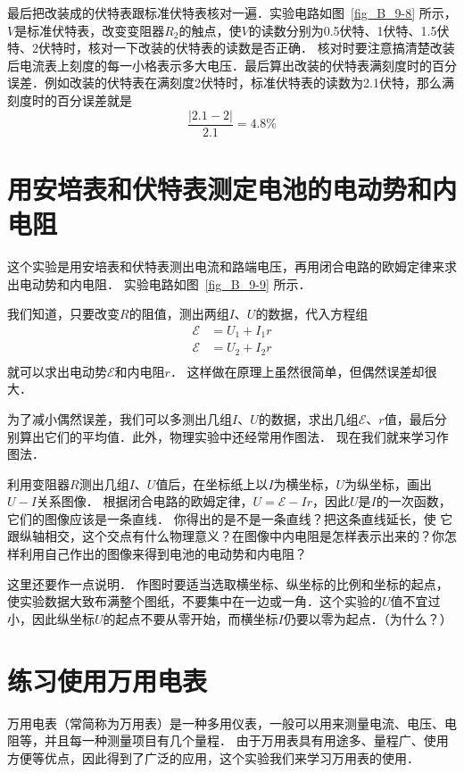 最后把改装成的伏特表跟标准伏特表核对一遍．实验电路如图~\ref{fig_B_9-8} 所示，$V$是标准伏特表，改变变阻器$R_2$的触点，使$V$的读数分别为0.5伏特、1伏特、1.5伏特、2伏特时，核对一下改装的伏特表的读数是否正确．
核对时要注意搞清楚改装后电流表上刻度的每一小格表示多大电压．最后算出改装的伏特表满刻度时的百分误差．例如改装的伏特表在满刻度2伏特时，标准伏特表的读数为2.1伏特，那么满刻度时的百分误差就是
\[\frac{|2.1-2|}{2.1}=4.8\%\]

\section{用安培表和伏特表测定电池的电动势和内电阻}

这个实验是用安培表和伏特表测出电流和路端电压，再用闭合电路的欧姆定律来求出电动势和内电阻．
实验电路如图~\ref{fig_B_9-9} 所示．

我们知道，只要改变$R$的阻值，测出两组$I$、$U$的数据，代入方程组
\[\begin{split}
    \mathcal{E}&=U_1+I_1r\\
    \mathcal{E}&=U_2+I_2r\\
\end{split}\]
就可以求出电动势$\mathcal{E}$和内电阻$r$．
这样做在原理上虽然很简单，但偶然误差却很大．

为了减小偶然误差，我们可以多测出几组$I$、$U$的数据，求出几组$\mathcal{E}$、$r$值，最后分别算出它们的平均值．此外，物理实验中还经常用作图法．
现在我们就来学习作图法．

利用变阻器$R$测出几组$I$、$U$值后，在坐标纸上以$I$为横坐标，$U$为纵坐标，画出$U-I$关系图像．
根据闭合电路的欧姆定律，$U=\mathcal{E}-Ir$，因此$U$是$I$的一次函数，它们的图像应该是一条直线．
你得出的是不是一条直线？把这条直线延长，使
它跟纵轴相交，这个交点有什么物理意义？在图像中内电阻是怎样表示出来的？你怎样利用自己作出的图像来得到电池的电动势和内电阻？

这里还要作一点说明．
作图时要适当选取横坐标、纵坐标的比例和坐标的起点，使实验数据大致布满整个图纸，不要集中在一边或一角．这个实验的$U$值不宜过小，因此纵坐标$U$的起点不要从零开始，而横坐标$I$仍要以零为起点．（为什么？）

\section{练习使用万用电表}
万用电表（常简称为万用表）是一种多用仪表，一般可以用来测量电流、电压、电阻等，并且每一种测量项目有几个量程．
由于万用表具有用途多、量程广、使用方便等优点，因此得到了广泛的应用，这个实验我们来学习万用表的使用．

